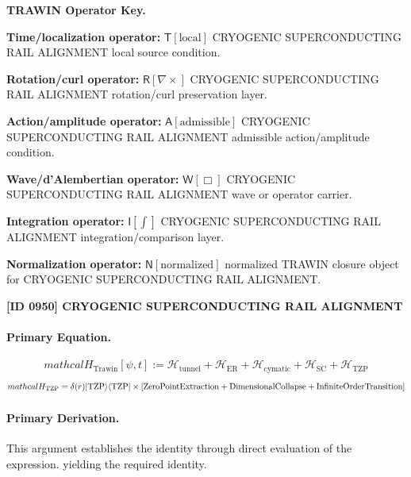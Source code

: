 \par\vspace{0.45\baselineskip}
\noindent\begin{minipage}[t]{\linewidth}
\begingroup
\small
\raggedright
\textbf{TRAWIN Operator Key.}\par
\noindent\textbf{Time/localization operator:} $\mathsf{T}\!\left[\mathrm{local}\right]$ CRYOGENIC SUPERCONDUCTING RAIL ALIGNMENT local source condition.\par
\noindent\textbf{Rotation/curl operator:} $\mathsf{R}\!\left[\nabla\times\right]$ CRYOGENIC SUPERCONDUCTING RAIL ALIGNMENT rotation/curl preservation layer.\par
\noindent\textbf{Action/amplitude operator:} $\mathsf{A}\!\left[\mathrm{admissible}\right]$ CRYOGENIC SUPERCONDUCTING RAIL ALIGNMENT admissible action/amplitude condition.\par
\noindent\textbf{Wave/d'Alembertian operator:} $\mathsf{W}\!\left[\Box\right]$ CRYOGENIC SUPERCONDUCTING RAIL ALIGNMENT wave or operator carrier.\par
\noindent\textbf{Integration operator:} $\mathsf{I}\!\left[\int\right]$ CRYOGENIC SUPERCONDUCTING RAIL ALIGNMENT integration/comparison layer.\par
\noindent\textbf{Normalization operator:} $\mathsf{N}\!\left[\mathrm{normalized}\right]$ normalized TRAWIN closure object for CRYOGENIC SUPERCONDUCTING RAIL ALIGNMENT.\par
\endgroup
\end{minipage}

\clearpage
\noindent\textbf{[ID 0950] CRYOGENIC SUPERCONDUCTING RAIL ALIGNMENT}\par
\vspace{0.35em}
\paragraph{Primary Equation.}
\[
mathcal{H}_{\text{Trawin}}[\psi, t] := \mathcal{H}_{\text{tunnel}} + \mathcal{H}_{\text{ER}} + \mathcal{H}_{\text{cymatic}} + \mathcal{H}_{\text{SC}} + \mathcal{H}_{\text{TZP}}
\]
\[
mathcal{H}_{\text{TZP}} = \delta(r)|{\rm TZP}\rangle\langle{\rm TZP}| \times \left[\text{ZeroPointExtraction} + \text{DimensionalCollapse} + \text{InfiniteOrderTransition}\right]
\]

\paragraph{Primary Derivation.}
This argument establishes the identity through direct evaluation of the expression. yielding the required identity.
